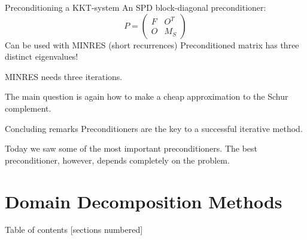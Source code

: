 \begin{frame}{Preconditioning a KKT-system}
  An SPD block-diagonal preconditioner:
  \begin{equation*}
    P=
    \begin{pmatrix}
F & O^T\\
O & M_S
    \end{pmatrix}
  \end{equation*}
Can be used with \textsc{MINRES} (short recurrences)
Preconditioned matrix has three distinct eigenvalues!

\textsc{MINRES} needs three iterations.

The main question is again how to make a cheap approximation
to the Schur complement.
\end{frame}

\begin{frame}{Concluding remarks}
  Preconditioners are the key to a successful iterative method.


Today we saw some of the most important preconditioners. The
best preconditioner, however, depends completely on the
problem.
\end{frame}


\section{Domain Decomposition Methods}

\begin{frame}{Table of contents}
  [sections numbered]
  \tableofcontents[hideallsubsections]
\end{frame}
